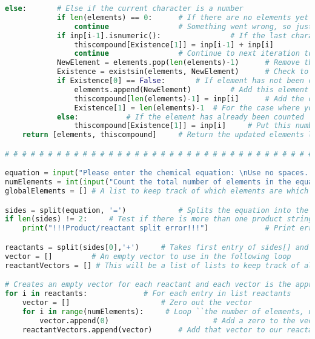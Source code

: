 \documentclass[10pt]{article}
\begin{document}
\begin{lstlisting}[language = Python]
		else:		# Else if the current character is a number
			if len(elements) == 0:		# If there are no elements yet in the list
				continue				# Something went wrong, so just keep going
			if inp[i-1].isnumeric():				# If the last character was also a number
				thiscompound[Existence[1]] = inp[i-1] + inp[i]				# Add this character to the existing number ** (concatination of strings, not addition)
				continue				# Continue to next iteration to avoid redefining the entry 
			NewElement = elements.pop(len(elements)-1)		# Remove the last element from the list
			Existence = existsin(elements, NewElement)		# Check to see if this element has already been counted
			if Existence[0] == False:		# If element has not been counted
				elements.append(NewElement)			# Add this element to the elements list
				thiscompound[len(elements)-1] = inp[i]		# Add the current number to the vector
				Existence[1] = len(elements)-1	# For the case where you have a multi-digit number **
			else:			# If the element has already been counted
				thiscompound[Existence[1]] = inp[i]		# Put this number in the appropriate place on the list.
    return [elements, thiscompound]		# Return the updated elements list and the compounds vector

# # # # # # # # # # # # # # # # # # # # # # # # # # # # # # # # # # # # # # # # # # # # # # #

equation = input("Please enter the chemical equation: \nUse no spaces. Use '=' for the arrow. Do not exclude 1 as a subscript. Simplify all compounds.")			# Asks user to enter equation
numElements = int(input("Count the total number of elements in the equation \n For example CHO+O2=CO2+H20 has 3 elements, C H and O."))			# Asks user to enter number of elements in equation
globalElements = []	# A list to keep track of which elements are which entry in each vector

sides = split(equation, '=')			# Splits the equation into the reactants and the products
if len(sides) != 2:		# Test if there is more than one product string and one reactant string
	print("!!!Product/reactant split error!!!")				# Print error message is this happens

reactants = split(sides[0],'+') 	# Takes first entry of sides[] and splits it, these are the reactants
vector = [] 		# An empty vector to use in the following loop
reactantVectors = [] # This will be a list of lists to keep track of all the vectors for the reactants

# Creates an empty vector for each reactant and each vector is the appropriate size for the number of elements.
for i in reactants:  			# For each entry in list reactants
	vector = []  					# Zero out the vector
	for i in range(numElements):	 # Loop ``the number of elements, numElements'' times
		vector.append(0)     					# Add a zero to the vector
	reactantVectors.append(vector) 		# Add that vector to our reactant Vectors


\end{lstlisting}
\end{document}

